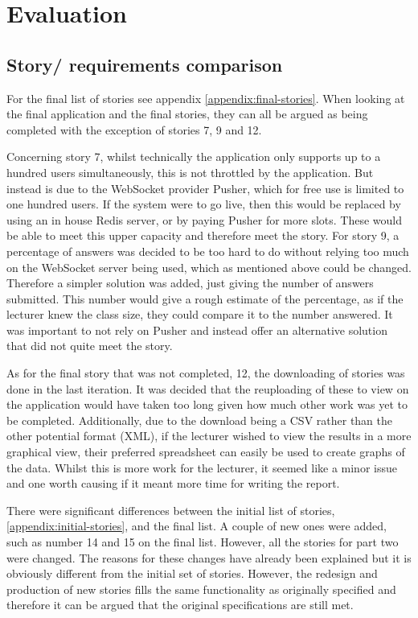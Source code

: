 \chapter{Evaluation}
\section{Story/ requirements comparison}
For the final list of stories see appendix \ref{appendix:final-stories}. When looking at the final application and the final stories, they can all be argued as being completed with the exception of stories 7, 9 and 12. 

Concerning story 7, whilst technically the application only supports up to a hundred users simultaneously, this is not throttled by the application. But instead is due to the WebSocket provider Pusher, which for free use is limited to one hundred users. If the system were to go live, then this would be replaced by using an in house Redis server, or by paying Pusher for more slots. These would be able to meet this upper capacity and therefore meet the story. For story 9, a percentage of answers was decided to be too hard to do without relying too much on the WebSocket server being used, which as mentioned above could be changed. Therefore a simpler solution was added, just giving the number of answers submitted. This number would give a rough estimate of the percentage, as if the lecturer knew the class size, they could compare it to the number answered. It was important to not rely on Pusher and instead offer an alternative solution that did not quite meet the story.

As for the final story that was not completed, 12, the downloading of stories was done in the last iteration. It was decided that the reuploading of these to view on the application would have taken too long given how much other work was yet to be completed. Additionally, due to the download being a CSV rather than the other potential format (XML), if the lecturer wished to view the results in a more graphical view, their preferred spreadsheet can easily be used to create graphs of the data. Whilst this is more work for the lecturer, it seemed like a minor issue and one worth causing if it meant more time for writing the report.

There were significant differences between the initial list of stories, \ref{appendix:initial-stories}, and the final list. A couple of new ones were added, such as number 14 and 15 on the final list. However, all the stories for part two were changed. The reasons for these changes have already been explained but it is obviously different from the initial set of stories. However, the redesign and production of new stories fills the same functionality as originally specified and therefore it can be argued that the original specifications are still met.

